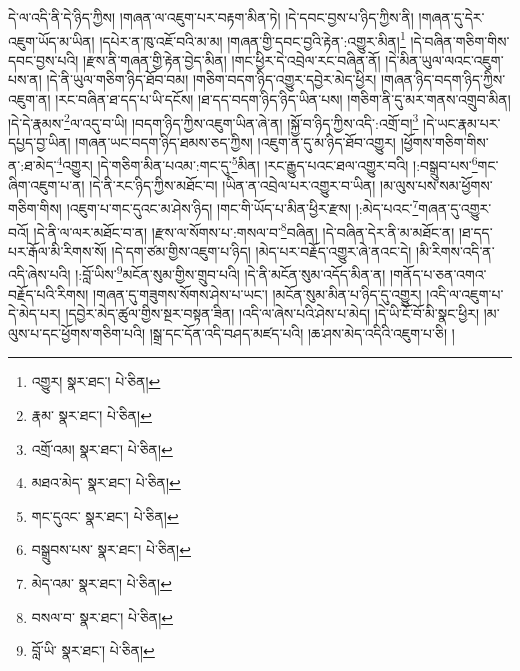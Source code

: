 དེ་ལ་འདི་ནི་དེ་ཉིད་ཀྱིས། །གཞན་ལ་འཇུག་པར་བརྟག་མིན་ཏེ། །དེ་དབང་བྱས་པ་ཉིད་ཀྱིས་ནི། །གཞན་དུ་དེར་འཇུག་ཡོད་མ་ཡིན། །དཔེར་ན་ཁུ་འཇོ་བའི་མ་མ། །གཞན་གྱི་དབང་བྱའི་རྟེན་:འགྱུར་མིན།\footnote{འགྱུར།  སྣར་ཐང་།  པེ་ཅིན། } །དེ་བཞིན་གཅིག་གིས་དབང་བྱས་པའི། །རྫས་ནི་གཞན་གྱི་རྟེན་བྱེད་མིན། །གང་ཕྱིར་དེ་འབྲེལ་རང་བཞིན་ནོ། །དེ་མིན་ཡུལ་ལའང་འཇུག་པས་ན། །དེ་ནི་ཡུལ་གཅིག་ཉིད་ཐོབ་བམ། །གཅིག་བདག་ཉིད་འགྱུར་དབྱེར་མེད་ཕྱིར། །གཞན་ཉིད་བདག་ཉིད་ཀྱིས་འཇུག་ན། །རང་བཞིན་ཐ་དད་པ་ཡི་དངོས། །ཐ་དད་བདག་ཉིད་ཉིད་ཡིན་པས། །གཅིག་ནི་དུ་མར་གནས་འགྲུབ་མིན། །དེ་དེ་རྣམས་\footnote{རྣམ་  སྣར་ཐང་།  པེ་ཅིན། }ལ་འདུ་བ་ཡི། །བདག་ཉིད་ཀྱིས་འཇུག་ཡིན་ཞེ་ན། །སྐྱོ་བ་ཉིད་ཀྱིས་འདི་:འགྲོ་བ།\footnote{འགྲོ་འམ།  སྣར་ཐང་།  པེ་ཅིན། } །དེ་ཡང་རྣམ་པར་དཔྱད་བྱ་ཡིན། །གཞན་ཡང་བདག་ཉིད་ཐམས་ཅད་ཀྱིས། །འཇུག་ན་དུ་མ་ཉིད་ཐོབ་འགྱུར། །ཕྱོགས་གཅིག་གིས་ན་:ཐ་མེད་\footnote{མཐའ་མེད་  སྣར་ཐང་།  པེ་ཅིན། }འགྱུར། །དེ་གཅིག་མིན་པའམ་:གང་དུ་\footnote{གང་དུའང་  སྣར་ཐང་།  པེ་ཅིན། }མིན། །རང་རྒྱུད་པའང་ཐལ་འགྱུར་བའི། །:བསྒྲུབ་པས་\footnote{བསྒྲུབས་པས་  སྣར་ཐང་།  པེ་ཅིན། }གང་ཞིག་འཇུག་པ་ན། །དེ་ནི་རང་ཉིད་ཀྱིས་མཐོང་བ། །ཡིན་ན་འབྲེལ་པར་འགྱུར་བ་ཡིན། །མ་ལུས་པས་སམ་ཕྱོགས་གཅིག་གིས། །འཇུག་པ་གང་དུའང་མ་ཤེས་ཉིད། །གང་གི་ཡོད་པ་མིན་ཕྱིར་རྫས། །:མེད་པའང་\footnote{མེད་འམ་  སྣར་ཐང་།  པེ་ཅིན། }གཞན་དུ་འགྱུར་བའོ། །དེ་ནི་ལ་ལར་མཐོང་བ་ན། །རྫས་ལ་སོགས་པ་:གསལ་བ་\footnote{བསལ་བ་  སྣར་ཐང་།  པེ་ཅིན། }བཞིན། །དེ་བཞིན་དེར་ནི་མ་མཐོང་ན། །ཐ་དད་པར་རྒོལ་མི་རིགས་སོ། །དེ་དག་ཙམ་གྱིས་འཇུག་པ་ཉིད། །མེད་པར་བརྗོད་འགྱུར་ཞེ་ནའང་དེ། །མི་རིགས་འདི་ན་འདི་ཞེས་པའི། །:བློ་ཡིས་\footnote{བློ་ཡི་  སྣར་ཐང་།  པེ་ཅིན། }མངོན་སུམ་གྱིས་གྲུབ་པའི། །དེ་ནི་མངོན་སུམ་འདོད་མིན་ན། །གནོད་པ་ཅན་འགའ་བརྗོད་པའི་རིགས། །གཞན་དུ་གཟུགས་སོགས་ཤེས་པ་ཡང་། །མངོན་སུམ་མིན་པ་ཉིད་དུ་འགྱུར། །འདི་ལ་འཇུག་པ་དེ་མེད་པར། །དབྱེར་མེད་ཚུལ་གྱིས་སྔར་བསྟན་ཟིན། །འདི་ལ་ཞེས་པའི་ཤེས་པ་མེད། །དེ་ཡི་ངོ་བོ་མི་སྣང་ཕྱིར། །མ་ལུས་པ་དང་ཕྱོགས་གཅིག་པའི། །སྒྲ་དང་དོན་འདི་བཤད་མཛད་པའི། །ཆ་ཤས་མེད་འདིའི་འཇུག་པ་ཅི། །
